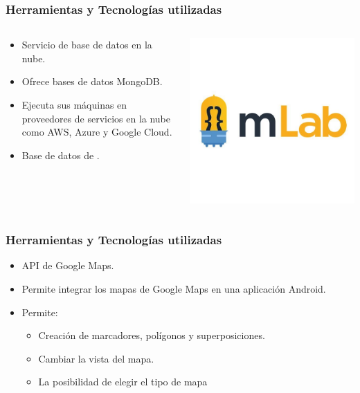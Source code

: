 \begin{frame}
	\frametitle{Herramientas y Tecnologías utilizadas}
	\begin{columns}
			\begin{column}{0.6\textwidth}
					\begin{itemize}
						\item {Servicio de base de datos en la nube.}
						\item {Ofrece bases de datos MongoDB}.
						\item {Ejecuta sus máquinas en proveedores de servicios en la nube como AWS, Azure y Google Cloud.}
						\item {Base de datos de \ULLAR{}.}
					\end{itemize}
				\endblock{}
			\end{column}
			\begin{column}{0.4\textwidth}
				\vfill 
					\begin{center}
						\includegraphics[width=0.8\linewidth]{Images/mlab}
					\end{center}
			\end{column}
	\end{columns}
\end{frame}

\begin{frame}
	\frametitle{Herramientas y Tecnologías utilizadas}
			\begin{itemize}
				\item {API de Google Maps.}
				\item {Permite integrar los mapas de Google Maps en una aplicación Android.}
				\item {Permite:}
				\begin{itemize}
					\item {Creación de marcadores, polígonos y superposiciones.}
					\item {Cambiar la vista del mapa.}
					\item {La posibilidad de elegir el tipo de mapa}
				\end{itemize}
			\end{itemize}
		\endblock{}
\end{frame}

